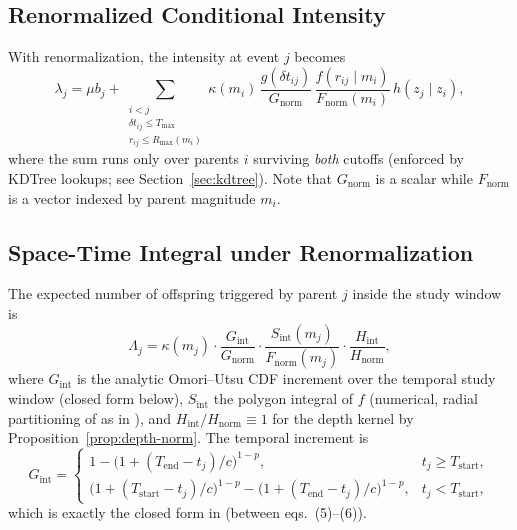 \documentclass[11pt,a4paper]{article}
\theoremstyle{plain}
\theoremstyle{definition}
\newcommand{\dt}{\delta t}
\newcommand{\Gnorm}{G_{\mathrm{norm}}}
\newcommand{\Fnorm}{F_{\mathrm{norm}}}
\newcommand{\Hnorm}{H_{\mathrm{norm}}}
\newcommand{\Hint}{H_{\mathrm{int}}}
\newcommand{\Gint}{G_{\mathrm{int}}}
\newcommand{\Sint}{S_{\mathrm{int}}}
\newcommand{\Tmax}{T_{\max}}
\newcommand{\Rmax}{R_{\max}}
\begin{document}
\subsection{Renormalized Conditional Intensity}\label{sec:renorm-intensity}

With renormalization, the intensity at event $j$ becomes
\begin{equation}\label{eq:intensity-j}
\lambda_j = \mu b_j
+ \sum_{\substack{i<j \\ \dt_{ij}\le\Tmax \\ r_{ij}\le\Rmax(m_i)}}
  \kappa(m_i)\,\frac{g(\dt_{ij})}{\Gnorm}\,
  \frac{f(r_{ij}\mid m_i)}{\Fnorm(m_i)}\, h(z_j\mid z_i),
\end{equation}
where the sum runs only over parents $i$ surviving \emph{both} cutoffs
(enforced by KDTree lookups; see Section~\ref{sec:kdtree}). Note that
$\Gnorm$ is a scalar while $\Fnorm$ is a vector indexed by parent magnitude
$m_i$.

\subsection{Space-Time Integral under Renormalization}\label{sec:space-time-int}

The expected number of offspring triggered by parent $j$ inside the study
window is
\begin{equation}\label{eq:lambda-j-int}
\Lambda_j = \kappa(m_j)\cdot
\frac{\Gint}{\Gnorm}\cdot
\frac{\Sint(m_j)}{\Fnorm(m_j)}\cdot
\frac{\Hint}{\Hnorm},
\end{equation}
where $\Gint$ is the analytic Omori--Utsu CDF increment over the temporal
study window (closed form below), $\Sint$ the polygon integral of $f$
(numerical, radial partitioning of \citet{O98} as in \citet{J19}), and
$\Hint/\Hnorm\equiv 1$ for the depth kernel by
Proposition~\ref{prop:depth-norm}. The temporal increment is
\begin{equation}\label{eq:gi}
\Gint =
\begin{cases}
1-\bigl(1+(T_{\mathrm{end}}-t_j)/c\bigr)^{1-p}, & t_j \ge T_{\mathrm{start}},\\[4pt]
\bigl(1+(T_{\mathrm{start}}-t_j)/c\bigr)^{1-p}
-\bigl(1+(T_{\mathrm{end}}-t_j)/c\bigr)^{1-p}, & t_j < T_{\mathrm{start}},
\end{cases}
\end{equation}
which is exactly the closed form in \cite[\S3]{J19} (between eqs.~(5)--(6)).
\end{document}
